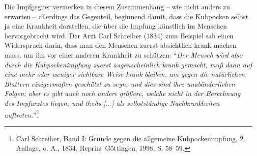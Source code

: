 \documentclass[
    a4paper,
    12pt,
    hyphens,
    chapterprefix=true,
    headheight=33pt,
    footheight=29pt,
    headings=optiontohead, %
]{scrartcl}
\begin{document}
{Die Impfgegner vermerken in diesem Zusammenhang -- wie nicht anders zu erwarten -- allerdings das Gegenteil, beginnend damit, dass die Kuhpocken selbst ja eine Krankheit darstellen, die über die Impfung künstlich im Menschen hervorgebracht wird. Der Arzt Carl Schreiber (1834) zum Beispiel sah  einen Widerspruch darin, dass man den Menschen zuerst absichtlich krank machen muss, um ihn vor einer anderen Krankheit zu schützen: "`\textit{Der Mensch wird also durch die Kuhpockenimpfung zuerst augenscheinlich krank gemacht, muß dann auf eine mehr oder weniger sichtbare Weise krank bleiben, um gegen die natürlichen Blattern einigermaßen geschützt zu seyn, und dies sind ihre unabänderlichen Folgen; aber es gibt auch noch andere größere, welche nicht in der Berechnung des Impfarztes liegen, und theils [...] als selbstständige Nachkrankheiten auftreten.}"'\footnote{Carl Schreiber, Band I: Gründe gegen die allgemeine Kuhpockenimpfung, 2. Auflage, o. A., 1834, Reprint Göttingen, 1998, S. 58--59.}\\
}
\end{document}
